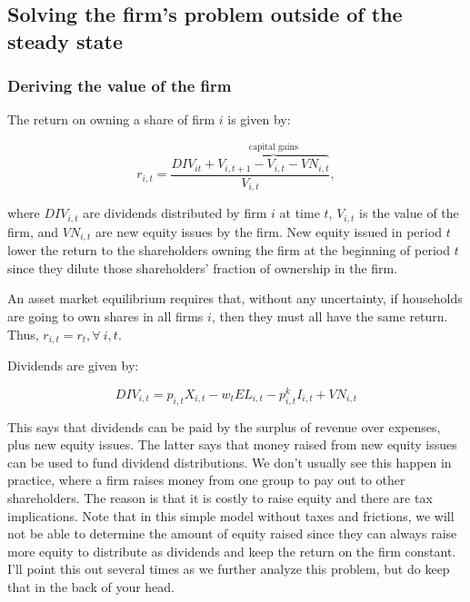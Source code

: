 \documentclass[letterpaper,12pt]{article}
\theoremstyle{definition}
\begin{document}
\begin{spacing}{1.5}
\subsection*{Solving the firm's problem outside of the steady state}

\subsubsection*{Deriving the value of the firm}

The return on owning a share of firm $i$ is given by:

\begin{equation}
\label{eqn:r_firm_i}
r_{i,t} = \frac{DIV_{it} + \overbrace{V_{i,t+1}-V_{i,t}-VN_{i,t}}^{\text{capital gains}}}{V_{i,t}}, 
\end{equation}

\noindent\noindent where $DIV_{i,t}$ are dividends distributed by firm $i$ at time $t$, $V_{i,t}$ is the value of the firm, and $VN_{i,t}$ are new equity issues by the firm.  New equity issued in period $t$ lower the return to the shareholders owning the firm at the beginning of period $t$ since they dilute those shareholders' fraction of ownership in the firm.  

An asset market equilibrium requires that, without any uncertainty, if households are going to own shares in all firms $i$, then they must all have the same return.  Thus, $r_{i,t}=r_{t}, \forall \ i,t$.

Dividends are given by:

\begin{equation}
\label{eqn:divs}
DIV_{i,t} = p_{i,t}X_{i,t}-w_{t}EL_{i,t}-p^{k}_{i,t}I_{i,t}+VN_{i,t}
\end{equation}

This says that dividends can be paid by the surplus of revenue over expenses, plus new equity issues.  The latter says that money raised from new equity issues can be used to fund dividend distributions.  We don't usually see this happen in practice, where a firm raises money from one group to pay out to other shareholders.  The reason is that it is costly to raise equity and there are tax implications.  Note that in this simple model without taxes and frictions, we will not be able to determine the amount of equity raised since they can always raise more equity to distribute as dividends and keep the return on the firm constant.  I'll point this out several times as we further analyze this problem, but do keep that in the back of your head.


\end{spacing}
\end{document}
